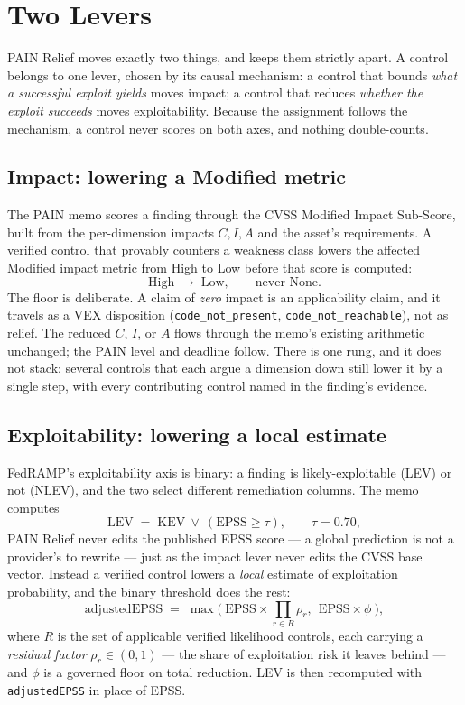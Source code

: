 \documentclass[11pt]{article}
\newcommand{\code}[1]{\texttt{#1}}
\begin{document}
\section{Two Levers}
\label{sec:levers}
PAIN Relief moves exactly two things, and keeps them strictly apart. A control
belongs to one lever, chosen by its causal mechanism: a control that bounds
\emph{what a successful exploit yields} moves impact; a control that reduces
\emph{whether the exploit succeeds} moves exploitability. Because the assignment
follows the mechanism, a control never scores on both axes, and nothing
double-counts.

\subsection{Impact: lowering a Modified metric}
\label{sec:impact}
The PAIN memo scores a finding through the CVSS Modified Impact Sub-Score, built
from the per-dimension impacts $C,I,A$ and the asset's requirements. A verified
control that provably counters a weakness class lowers the affected Modified
impact metric from High to Low before that score is computed:
\begin{equation}
\text{High} \;\longrightarrow\; \text{Low}, \qquad \text{never } \text{None}.
\label{eq:rung}
\end{equation}
The floor is deliberate. A claim of \emph{zero} impact is an applicability claim,
and it travels as a VEX disposition (\code{code\_not\_present},
\code{code\_not\_reachable}), not as relief. The reduced $C$, $I$, or $A$ flows
through the memo's existing arithmetic unchanged; the PAIN level and deadline
follow. There is one rung, and it does not stack: several controls that each
argue a dimension down still lower it by a single step, with every contributing
control named in the finding's evidence.

\subsection{Exploitability: lowering a local estimate}
\label{sec:exploit}
FedRAMP's exploitability axis is binary: a finding is likely-exploitable (LEV) or
not (NLEV), and the two select different remediation columns. The memo computes
\[
\text{LEV} \;=\; \text{KEV} \ \lor\ (\text{EPSS} \ge \tau),
\qquad \tau = 0.70,
\]
PAIN Relief never edits the published
EPSS score --- a global prediction is not a provider's to rewrite --- just as the
impact lever never edits the CVSS base vector. Instead a verified control lowers
a \emph{local} estimate of exploitation probability, and the binary threshold
does the rest:
\begin{equation}
\mathrm{adjustedEPSS} \;=\; \max\!\Big(\ \mathrm{EPSS}\times\!\!\prod_{r\in R}\rho_r,\ \
\mathrm{EPSS}\times\phi\ \Big),
\label{eq:adjepss}
\end{equation}
where $R$ is the set of applicable verified likelihood controls, each carrying a
\emph{residual factor} $\rho_r\in(0,1)$ --- the share of exploitation risk it
leaves behind --- and $\phi$ is a governed floor on total reduction. LEV is then
recomputed with \code{adjustedEPSS} in place of EPSS.
\end{document}
